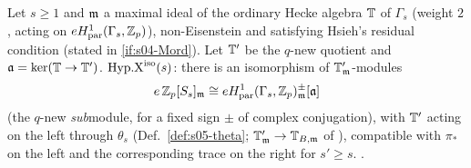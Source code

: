 \begin{definition}\label{def:s05-Xiso}
Let $s\ge1$ and $\mathfrak{m}$ a maximal ideal of the ordinary Hecke algebra $\mathbb{T}$ of $\Gamma_s$ (weight $2$, acting on $eH^1_{\rm par}(\Gamma_s,\mathbb{Z}_p)$),
non-Eisenstein and satisfying Hsieh's residual condition (stated in \ref{if:s04-Mord}). Let $\mathbb{T}'$ be the $q$-new quotient and
$\mathfrak{a}=\ker(\mathbb{T}\to\mathbb{T}')$. $\mathrm{Hyp.X}^{\mathrm{iso}}(s)$: there is an isomorphism of $\mathbb{T}'_{\mathfrak{m}}$-modules
\[e\,\mathbb{Z}_p[S_s]_{\mathfrak{m}}\cong eH^1_{\rm par}(\Gamma_s,\mathbb{Z}_p)^{\pm}_{\mathfrak{m}}[\mathfrak{a}]\]
(the $q$-new \emph{sub}module, for a fixed sign $\pm$ of complex conjugation), with $\mathbb{T}'$ acting on the left through $\theta_s$
(Def.~\ref{def:s05-theta}; $\mathbb{T}'_{\mathfrak{m}}\to\mathbb{T}_{B,\mathfrak{m}}$ of ), compatible with $\pi_*$ on the left and the corresponding trace on
the right for $s'\ge s$. \sthyp.
\end{definition}

